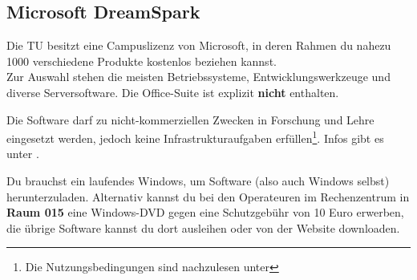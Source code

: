 
\subsection{Microsoft DreamSpark}
	\label{msdnaa}
	Die TU besitzt eine Campuslizenz von Microsoft, in deren Rahmen du nahezu 1000 verschiedene Produkte kostenlos beziehen kannst.\\
	Zur Auswahl stehen die meisten Betriebssysteme, Entwicklungswerkzeuge und diverse Serversoftware. Die Office-Suite ist explizit \textbf{nicht} enthalten.

	Die Software darf zu nicht-kommerziellen Zwecken in Forschung und Lehre eingesetzt werden, jedoch keine Infrastrukturaufgaben erfüllen\footnote{Die Nutzungsbedingungen sind nachzulesen unter }. Infos gibt es unter .

	Du brauchst ein laufendes Windows, um Software (also auch Windows selbst) herunterzuladen. Alternativ kannst du bei den Operateuren im Rechenzentrum in \textbf{Raum 015} eine Windows-DVD gegen eine Schutzgebühr von 10 Euro erwerben, die übrige Software kannst du dort ausleihen oder von der Website downloaden.
